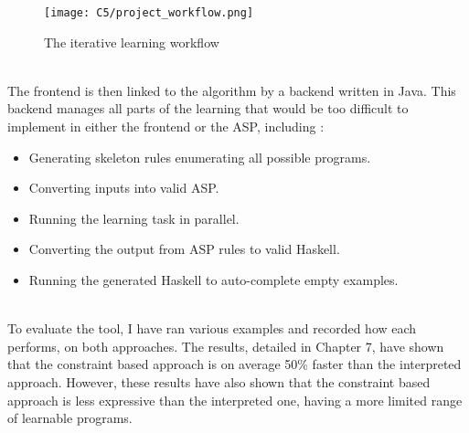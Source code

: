 \begin{figure}[h!]
\centering
\texttt{[image: C5/project\_workflow.png]}
\caption{The iterative learning workflow}
\end{figure}
\mbox{}\\ 
The frontend is then linked to the algorithm by a backend written in Java. This backend manages all parts of the learning that would be too difficult to implement in either the frontend or the ASP, including :
\begin{itemize}
\item Generating skeleton rules enumerating all possible programs.
\item Converting inputs into valid ASP.
\item Running the learning task in parallel.
\item Converting the output from ASP rules to valid Haskell.
\item Running the generated Haskell to auto-complete empty examples.
\end{itemize}
\mbox{}\\
To evaluate the tool, I have ran various examples and recorded how each performs, on both approaches. The results, detailed in Chapter 7, have shown that the constraint based approach is on average 50\% faster than the interpreted approach. However, these results have also shown that the constraint based approach is less expressive than the interpreted one, having a more limited range of learnable programs.


\pagebreak
%
%